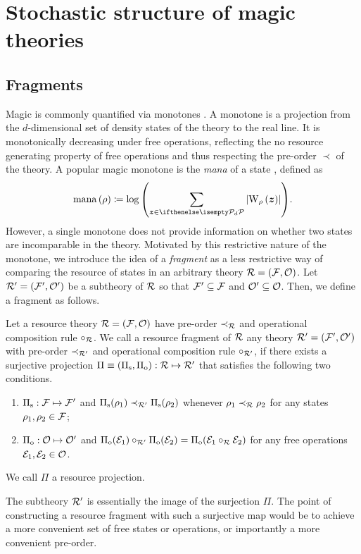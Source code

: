 \section{Stochastic structure of magic theories}
\label{sec:struc}

\subsection{Fragments}\label{sec:frag}

Magic is commonly quantified via monotones . 
A monotone is a projection from the $d$-dimensional set of density states of the theory to the real line. 
It is monotonically decreasing under free operations, reflecting the no resource generating property of free operations and thus respecting the pre-order $\prec$ of the theory.
A popular magic monotone is the \emph{mana} of a state , defined as
\begin{equation}
    \mana{\rho} \coloneqq \log{\left(\sum\limits_{\bmz \in \pd} \abs{\W[\bmz]{\rho}}\right)}.
\end{equation}
However, a single monotone does not provide information on whether two states are incomparable in the theory.
Motivated by this restrictive nature of the monotone, we introduce the idea of a \emph{fragment} as a less restrictive way of comparing the resource of states in an arbitrary theory $\mathcal{R} = (\mathcal{F}, \mathcal{O})$. 
Let $\mathcal{R}' = (\mathcal{F}', \mathcal{O}')$ be a subtheory of $\mathcal{R}$ so that $\mathcal{F}' \subseteq \mathcal{F}$ and $\mathcal{O}' \subseteq \mathcal{O}$. 
Then, we define a fragment as follows.
\begin{definition}\label{def:fragment}
    Let a resource theory $\mathcal{R} = (\mathcal{F}, \mathcal{O})$ have pre-order $\prec_{\mathcal{R}}$ and operational composition rule $\circ_{\mathcal{R}}$. 
    We call a resource fragment of $\mathcal{R}$ any theory $\mathcal{R}' = (\mathcal{F}', \mathcal{O}')$ with pre-order $\prec_{\mathcal{R}'}$ and operational composition rule $\circ_{\mathcal{R}'}$, if there exists a surjective projection $\Pi \equiv (\Pi_{\rm{s}}, \Pi_{\rm{o}}): \mathcal{R} \mapsto \mathcal{R}'$ that satisfies the following two conditions.
    \begin{enumerate}
        \item $\Pi_{\rm{s}}: \mathcal{F} \mapsto \mathcal{F}'$ and $\Pi_{\rm{s}}(\rho_1) \prec_{\mathcal{R}'} \Pi_{\rm{s}}(\rho_2)$ whenever $\rho_1 \prec_{\mathcal{R}} \rho_2$ for any states $\rho_1, \rho_2 \in \mathcal{F}$;
        \item $\Pi_{\rm{o}}: \mathcal{O} \mapsto \mathcal{O}'$ and $\Pi_{\rm{o}}(\mathcal{E}_1) \circ_{\mathcal{R}'} \Pi_{\rm{o}}(\mathcal{E}_2) = \Pi_{\rm{o}}(\mathcal{E}_1 \circ_{\mathcal{R}} \mathcal{E}_2)$ for any free operations $\mathcal{E}_1, \mathcal{E}_2 \in \mathcal{O}$. 
    \end{enumerate}
    We call $\Pi$ a resource projection.
\end{definition}
The subtheory $\mathcal{R}'$ is essentially the image of the surjection $\Pi$.
The point of constructing a resource fragment with such a surjective map would be to achieve a more convenient set of free states or operations, or importantly a more convenient pre-order.

